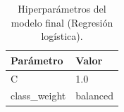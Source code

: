 \begin{table}[htbp]
 \centering
 \small
 \setlength{\tabcolsep}{4pt}
 \caption{Hiperparámetros del modelo final (Regresión logística).}
 \label{tab:params_finales}
 \begin{tabular}{ll}
  \toprule
  Parámetro & Valor \\
  \midrule
  C & 1.0 \\
  class\_weight & balanced \\
  \bottomrule
 \end{tabular}
\end{table}
